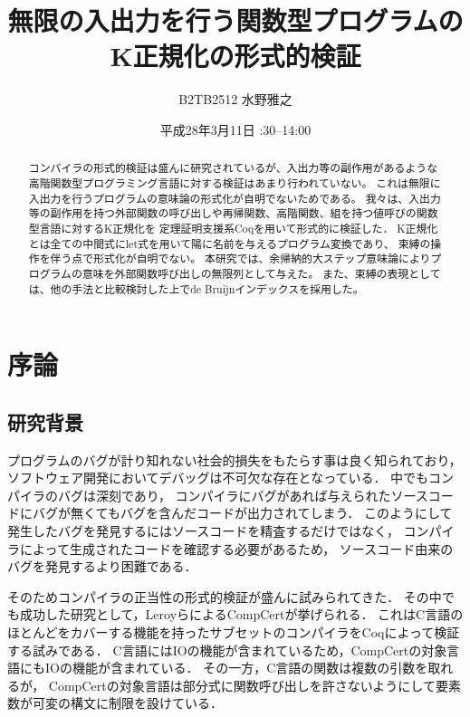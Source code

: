 \documentclass{sumiilab-paper}
\title{無限の入出力を行う関数型プログラムのK正規化の形式的検証}
\author{B2TB2512 水野雅之}
\institute{東北大学 大学院情報科学研究科\\情報基礎科学専攻}%
\date{平成28年3月11日 \quad 13:30--14:00}
\begin{document}
\maketitle

\begin{abstract}
コンパイラの形式的検証は盛んに研究されているが、入出力等の副作用があるような高階関数型プログラミング言語に対する検証はあまり行われていない。
これは無限に入出力を行うプログラムの意味論の形式化が自明でないためである。
我々は、入出力等の副作用を持つ外部関数の呼び出しや再帰関数、高階関数、組を持つ値呼びの関数型言語に対するK正規化を
定理証明支援系Coqを用いて形式的に検証した．
K正規化とは全ての中間式にlet式を用いて陽に名前を与えるプログラム変換であり、
束縛の操作を伴う点で形式化が自明でない。
本研究では、余帰納的大ステップ意味論によりプログラムの意味を外部関数呼び出しの無限列として与えた。
また、束縛の表現としては、他の手法と比較検討した上でde Bruijnインデックスを採用した。
\end{abstract}

\tableofcontents


\chapter{序論}


\section{研究背景}
プログラムのバグが計り知れない社会的損失をもたらす事は良く知られており，
ソフトウェア開発においてデバッグは不可欠な存在となっている．
中でもコンパイラのバグは深刻であり，
コンパイラにバグがあれば与えられたソースコードにバグが無くてもバグを含んだコードが出力されてしまう．
このようにして発生したバグを発見するにはソースコードを精査するだけではなく，
コンパイラによって生成されたコードを確認する必要があるため，
ソースコード由来のバグを発見するより困難である．

そのためコンパイラの正当性の形式的検証が盛んに試みられてきた．
その中でも成功した研究として，LeroyらによるCompCert\cite{2006-Leroy-Blazy-Dargaye}が挙げられる．
これはC言語のほとんどをカバーする機能を持ったサブセットのコンパイラをCoqによって検証する試みである．
C言語にはIOの機能が含まれているため，CompCertの対象言語にもIOの機能が含まれている．
その一方，C言語の関数は複数の引数を取れるが，
CompCertの対象言語は部分式に関数呼び出しを許さないようにして要素数が可変の構文に制限を設けている．
\end{document}
